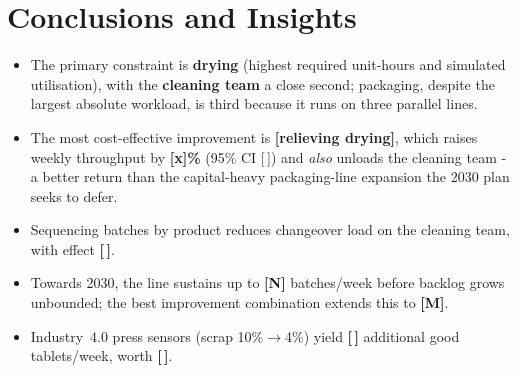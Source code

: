 \section{Conclusions and Insights}
\label{sec:conclusions}

\begin{itemize}\setlength\itemsep{1pt}
  \item The primary constraint is \textbf{drying} (highest required unit-hours
        and simulated utilisation), with the \textbf{cleaning team} a close
        second; packaging, despite the largest absolute workload, is third
        because it runs on three parallel lines.
  \item The most cost-effective improvement is \textbf{[relieving drying]},
        which raises weekly throughput by \textbf{[x]\%} (95\% CI [\,]) and
        \emph{also} unloads the cleaning team - a better return than the
        capital-heavy packaging-line expansion the 2030 plan seeks to defer.
  \item Sequencing batches by product reduces changeover load on the cleaning
        team, with effect \textbf{[\,]}.
  \item Towards 2030, the line sustains up to \textbf{[N]} batches/week before
        backlog grows unbounded; the best improvement combination extends this to
        \textbf{[M]}.
  \item Industry~4.0 press sensors (scrap 10\%$\rightarrow$4\%) yield
        \textbf{[\,]} additional good tablets/week, worth \textbf{[\,]}.
\end{itemize}
